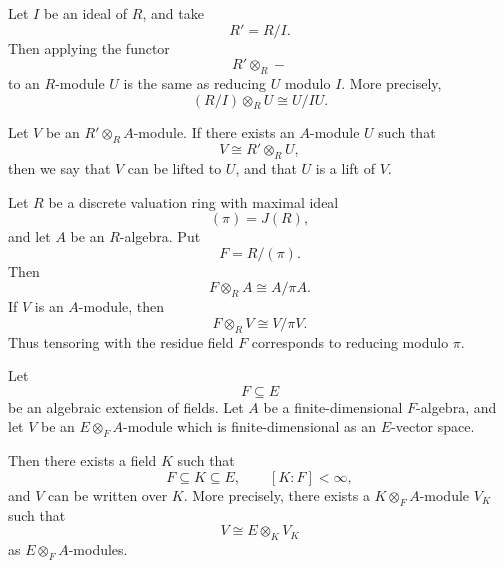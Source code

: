 \begin{example}
    Let \(I\) be an ideal of \(R\), and take
    \[
        R'=R/I.
    \]
    Then applying the functor
    \[
        R'\otimes_R -
    \]
    to an \(R\)-module \(U\) is the same as reducing \(U\) modulo \(I\). More
    precisely,
    \[
        (R/I)\otimes_R U\cong U/IU.
    \]
\end{example}

\begin{definition}
    Let \(V\) be an \(R'\otimes_R A\)-module. If there exists an \(A\)-module \(U\)
    such that
    \[
        V\cong R'\otimes_R U,
    \]
    then we say that \(V\) can be lifted to \(U\), and that \(U\) is a lift of \(V\).
\end{definition}

\begin{example}
    Let \(R\) be a discrete valuation ring with maximal ideal
    \[
        (\pi)=J(R),
    \]
    and let \(A\) be an \(R\)-algebra. Put
    \[
        F=R/(\pi).
    \]
    Then
    \[
        F\otimes_R A\cong A/\pi A.
    \]
    If \(V\) is an \(A\)-module, then
    \[
        F\otimes_R V\cong V/\pi V.
    \]
    Thus tensoring with the residue field \(F\) corresponds to reducing modulo
    \(\pi\).
\end{example}

\begin{proposition}
    Let
    \[
        F\subseteq E
    \]
    be an algebraic extension of fields. Let \(A\) be a finite-dimensional
    \(F\)-algebra, and let \(V\) be an \(E\otimes_F A\)-module which is finite-dimensional
    as an \(E\)-vector space.

    Then there exists a field \(K\) such that
    \[
        F\subseteq K\subseteq E,
        \qquad
        [K:F]<\infty,
    \]
    and \(V\) can be written over \(K\). More precisely, there exists a
    \(K\otimes_F A\)-module \(V_K\) such that
    \[
        V\cong E\otimes_K V_K
    \]
    as \(E\otimes_F A\)-modules.
\end{proposition}

